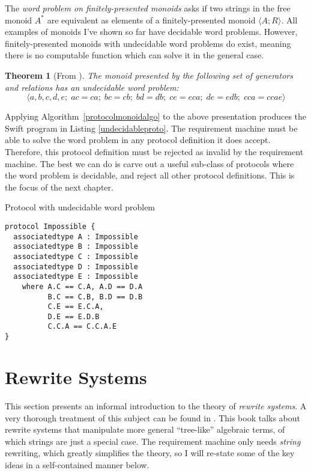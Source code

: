 \documentclass[headsepline,bibliography=totoc]{scrreport}
\newtheorem{theorem}{Theorem}[chapter]
\theoremstyle{definition}
\theoremstyle{definition}
\theoremstyle{definition}
\begin{document}
The \emph{word problem on finitely-presented monoids} asks if two strings in the free monoid $A^*$ are equivalent as elements of a finitely-presented monoid $\langle A; R\rangle$. All examples of monoids I've shown so far have decidable word problems. However, finitely-presented monoids with undecidable word problems do exist, meaning there is no computable function which can solve it in the general case.
\begin{theorem}[From \cite{undecidablegroup}]\label{undecidablemonoid} The monoid presented by the following set of generators and relations has an undecidable word problem:
\[\langle a, b, c, d, e;\;ac=ca;\;bc=cb;\;bd=db;\;ce=eca;\;de=edb;\;cca=ccae\rangle\]
\end{theorem}
Applying Algorithm~\ref{protocolmonoidalgo} to the above presentation produces the Swift program in Listing \ref{undecidableproto}. The requirement machine must be able to solve the word problem in any protocol definition it does accept. Therefore, this protocol definition must be rejected as invalid by the requirement machine. The best we can do is carve out a useful sub-class of protocols where the word problem is decidable, and reject all other protocol definitions. This is the focus of the next chapter.
\begin{listing}\caption{Protocol with undecidable word problem}\label{undecidableproto}
\begin{Verbatim}
protocol Impossible {
  associatedtype A : Impossible
  associatedtype B : Impossible
  associatedtype C : Impossible
  associatedtype D : Impossible
  associatedtype E : Impossible
    where A.C == C.A, A.D == D.A
          B.C == C.B, B.D == D.B
          C.E == E.C.A,
          D.E == E.D.B
          C.C.A == C.C.A.E
}
\end{Verbatim}
\end{listing}

\chapter{Rewrite Systems}\label{rewritesystemintro}

This section presents an informal introduction to the theory of \emph{rewrite systems}. A very thorough treatment of this subject can be found in \cite{andallthat}. This book talks about rewrite systems that manipulate more general ``tree-like'' algebraic terms, of which strings are just a special case. The requirement machine only needs \emph{string} rewriting, which greatly simplifies the theory, so I will re-state some of the key ideas in a self-contained manner below.
\end{document}
